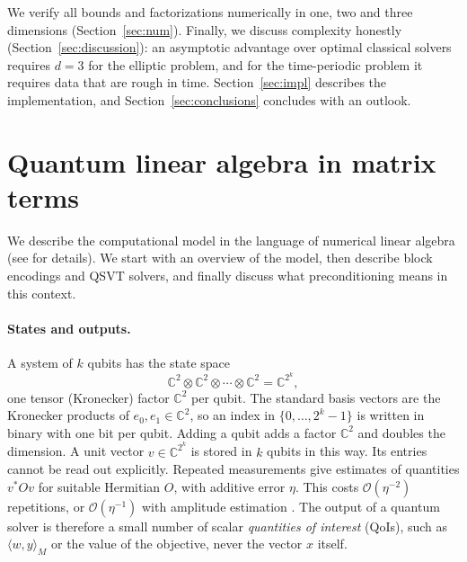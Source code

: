 \documentclass[11pt,a4paper]{article}
\newcommand{\C}{\mathbb{C}}
\theoremstyle{remark}
\begin{document}
We verify all bounds and factorizations numerically in one, two and three
dimensions (Section~\ref{sec:num}). Finally, we discuss complexity honestly
(Section~\ref{sec:discussion}): an asymptotic advantage over optimal
classical solvers requires $d=3$ for the elliptic problem, and for the
time-periodic problem it requires data that are rough in time.
Section~\ref{sec:impl} describes the implementation, and
Section~\ref{sec:conclusions} concludes with an outlook.

\section{Quantum linear algebra in matrix terms}\label{sec:prelim}

We describe the computational model in the language of numerical linear
algebra (see \cite{GSLW19,Lin22} for details). We start with an overview of the model, then describe block encodings and QSVT solvers, and finally discuss what preconditioning means in this context.

\paragraph{States and outputs.} A system of $k$ qubits has the state space
\[
\C^2\otimes\C^2\otimes\cdots\otimes\C^2=\C^{2^k},
\]
one tensor (Kronecker) factor $\C^2$ per qubit. The standard basis vectors are
the Kronecker products of $e_0,e_1\in\C^2$, so an index in $\{0,\dots,2^k-1\}$ is
written in binary with one bit per qubit. Adding a qubit adds a factor
$\C^2$ and doubles the dimension. A unit vector $v\in\C^{2^k}$ is stored in $k$
qubits in this way. Its entries cannot be read out explicitly. Repeated measurements give estimates of quantities $v^*Ov$ for suitable Hermitian $O$, with additive error
$\eta$. This costs $\mathcal{O}(\eta^{-2})$ repetitions, or $\mathcal{O}(\eta^{-1})$ with amplitude
estimation \cite{BHMT02}. The output of a quantum solver is therefore a
small number of scalar \emph{quantities of interest} (QoIs), such as
$\langle w,y\rangle_M$ or the value of the objective, never the vector $x$ itself.
\end{document}
